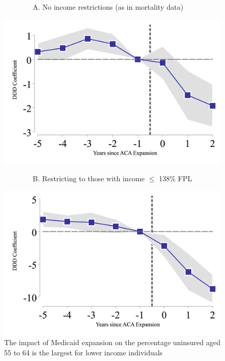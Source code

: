 \documentclass[12pt]{article}%
\begin{document}
\begin{appendices}
   \begin{figure}[H]
    \caption{The impact of Medicaid expansion on the percentage uninsured aged 55 to 64 is the largest for lower income individuals}
    \begin{minipage}{.6\linewidth}
    \centering
    \begin{flushleft}
            ~~~~~~~~A. No income restrictions (as in mortality data) \\
      \end{flushleft}
      \includegraphics[width=\linewidth]{../output/first_stage/fs_ddd_55-64vs65-74_ExpvsNoExp.png}
                \begin{flushleft}
            ~~~~~~~~B. Restricting to those with income $\leq$ 138\% FPL \\
        \end{flushleft}
      \includegraphics[width=\linewidth]{../output/first_stage/fs_ddd_55-64vs65-74_ExpvsNoExp_blw138pvt.png}

\end{minipage}
\end{figure}
\end{appendices}
\end{document}
